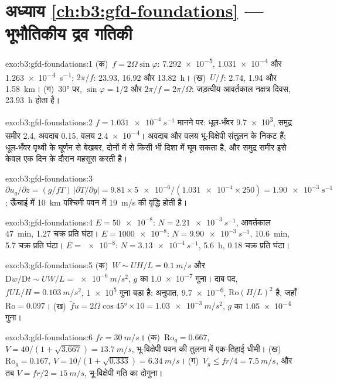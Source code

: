 \section*{अध्याय \ref{ch:b3:gfd-foundations} --- भूभौतिकीय द्रव गतिकी}

\begin{solution}{exo:b3:gfd-foundations:1}
(क)~$f = 2\Omega\sin\varphi$: \num{7.292e-5}, \num{1.031e-4} और
\qty{1.263e-4}{s^{-1}}; $2\pi/f$: 23.93, 16.92 और \qty{13.82}{h}।
(ख)~$U/f$: 2.74, 1.94 और \qty{1.58}{km}। (ग)~\ang{30} पर, $\sin\varphi =
1/2$ और $2\pi/f = 2\pi/\Omega$: जड़त्वीय आवर्तकाल नक्षत्र दिवस,
\qty{23.93}{h} होता है।
\end{solution}

\begin{solution}{exo:b3:gfd-foundations:2}
$f = \qty{1.031e-4}{s^{-1}}$ मानने पर: धूल-भँवर \num{9.7e3}, समुद्र समीर 2.4,
अवदाब 0.15, वलय \num{2.4e-4}। अवदाब और वलय भू-विक्षेपी
संतुलन के निकट हैं; धूल-भँवर पृथ्वी के घूर्णन से बेखबर,
दोनों में से किसी भी दिशा में घूम सकता है, और समुद्र समीर इसे केवल एक दिन के दौरान महसूस करती है।
\end{solution}

\begin{solution}{exo:b3:gfd-foundations:3}
$\partial u_g/\partial z = (g/fT)\,|\partial T/\partial y| = 9.81\times
\num{5e-6}/(\num{1.031e-4}\times250) = \qty{1.90e-3}{s^{-1}}$; ऊँचाई में
\qty{10}{km} पश्चिमी पवन में \qty{19}{m/s} की वृद्धि होती है।
\end{solution}

\begin{solution}{exo:b3:gfd-foundations:4}
$E = \num{50e-8}$: $N = \qty{2.21e-3}{s^{-1}}$, आवर्तकाल
\qty{47}{min}, \num{1.27} चक्र प्रति घंटा। $E = \num{1000e-8}$: $N = \qty{9.90e-3}{s^{-1}}$,
\qty{10.6}{min}, 5.7 चक्र प्रति घंटा। $E = \num{e-8}$: $N =
\qty{3.13e-4}{s^{-1}}$, \qty{5.6}{h}, 0.18 चक्र प्रति घंटा।
\end{solution}

\begin{solution}{exo:b3:gfd-foundations:5}
(क)~$W \sim UH/L = \qty{0.1}{m/s}$ और $\mathrm Dw/\mathrm Dt \sim UW/L =
\qty{e-6}{m/s^2}$, $g$ का \num{1.0e-7} गुना। दाब पद, $fUL/H =
\qty{0.103}{m/s^2}$, \num{1e5} गुना बड़ा है: अनुपात, \num{9.7e-6},
$\mathrm{Ro}(H/L)^2$ है, जहाँ $\mathrm{Ro} = 0.097$। (ख)~$\tilde fu =
2\Omega\cos\ang{45}\times10 = \qty{1.03e-3}{m/s^2}$, $g$ का \num{1.05e-4} गुना।
\end{solution}

\begin{solution}{exo:b3:gfd-foundations:6}
$fr = \qty{30}{m/s}$। (क)~$\mathrm{Ro}_g = 0.667$, $V = 40/(1 + \sqrt{3.667})
= \qty{13.7}{m/s}$, भू-विक्षेपी पवन की तुलना में एक-तिहाई धीमी। (ख)~$\mathrm{Ro}_g =
0.167$, $V = 10/(1 + \sqrt{0.333}) = \qty{6.34}{m/s}$। (ग)~$V_g \le fr/4 =
\qty{7.5}{m/s}$, और तब $V = fr/2 = \qty{15}{m/s}$, भू-विक्षेपी
गति का दोगुना।
\end{solution}

